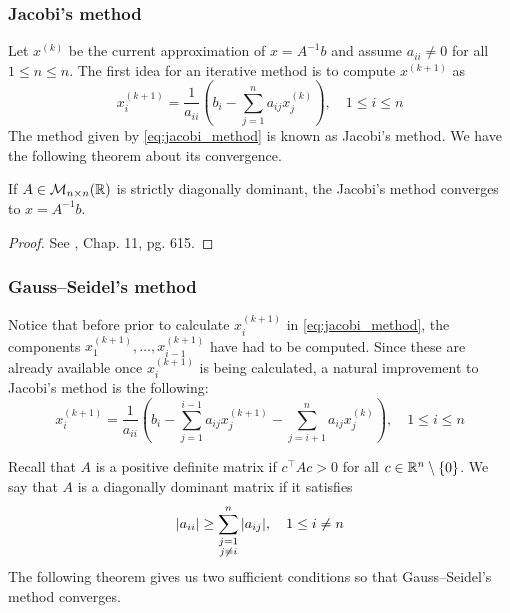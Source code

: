 \subsubsection{Jacobi's method}

Let $x^{(k)}$ be the current approximation of $x = A^{-1} b$ and assume $a_{ii}
\neq 0$ for all $1 \leq n \leq n$. The first idea for an iterative method is to
compute $x^{(k+1)}$ as
\begin{equation} \label{eq:jacobi_method}
    x_i^{(k+1)} = 
    \frac{1}{a_{ii}} \left( b_i - \sum_{j=1}^n a_{ij} x_j^{(k)} \right), 
    \quad 1 \leq i \leq n
\end{equation}
The method given by \eqref{eq:jacobi_method} is known as Jacobi's method. We
have the following theorem about its convergence.

\begin{theorem}
    If $A \in \mathcal{M}_{n \times n}(\mathbb{R})$ is strictly diagonally dominant,
    the Jacobi's method converges to $x = A^{-1} b$. 
\end{theorem}
\begin{proof}
    See \cite{golub2013matrix}, Chap. 11, pg. 615.
\end{proof}

\subsubsection{Gauss--Seidel's method}

Notice that before prior to calculate $x_i^{(k+1)}$ in \eqref{eq:jacobi_method},
the components $x_1^{(k+1)}, \ldots, x_{i-1}^{(k+1)}$ have had to be computed.
Since these are already available once $x_i^{(k+1)}$ is being calculated, a
natural improvement to Jacobi's method is the following:
\begin{equation*}
    x_i^{(k+1)} = 
    \frac{1}{a_{ii}} \left( b_i - \sum_{j=1}^{i-1} a_{ij} x_j^{(k+1)} - \sum_{j=i+1}^{n} a_{ij} x_j^{(k)} \right), 
    \quad 1 \leq i \leq n
\end{equation*}

Recall that $A$ is a positive definite matrix if $c^\top A c > 0$ for all $c \in
\mathbb{R}^n \setminus \{ 0 \}$. We say that $A$ is a diagonally dominant matrix if
it satisfies
\begin{equation*}
    \abs{a_{ii}} \geq \sum_{\substack{j = 1 \\ j \neq i}}^n \abs{a_{ij}}, 
    \quad 1 \leq i \neq n
\end{equation*}
The following theorem gives us two sufficient conditions so that Gauss--Seidel's
method converges.

